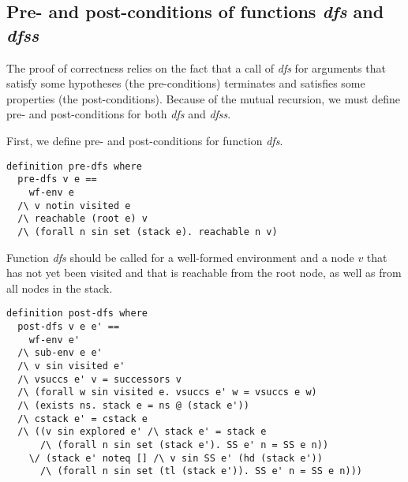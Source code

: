 \documentclass[sigplan,10pt,anonymous,review]{acmart}
\newcommand{\prog}[1]{\textit{#1}}
\begin{document}
\subsection{Pre- and post-conditions of functions \prog{dfs} and \prog{dfss}}
\label{sec:pre-post}

The proof of correctness relies on the fact that a call of \prog{dfs} for arguments that satisfy some hypotheses (the pre-conditions) terminates and satisfies some properties (the post-conditions). Because of the mutual recursion, we must define pre- and post-conditions for both \prog{dfs} and \prog{dfss}.

First, we define pre- and post-conditions for function \prog{dfs}.

\begin{small}
\begin{lstlisting}[language=isabelle]
definition pre-dfs where 
  pre-dfs v e ==
    wf-env e
  /\ v notin visited e
  /\ reachable (root e) v
  /\ (forall n sin set (stack e). reachable n v)
\end{lstlisting}
\end{small}

Function \prog{dfs} should be called for a well-formed environment and a node $v$ that has not yet been visited and that is reachable from the root node, as well as from all nodes in the stack.

\begin{small}
\begin{lstlisting}[language=isabelle]
definition post-dfs where 
  post-dfs v e e' ==
    wf-env e'
  /\ sub-env e e'
  /\ v sin visited e'
  /\ vsuccs e' v = successors v
  /\ (forall w sin visited e. vsuccs e' w = vsuccs e w)
  /\ (exists ns. stack e = ns @ (stack e'))
  /\ cstack e' = cstack e
  /\ ((v sin explored e' /\ stack e' = stack e 
      /\ (forall n sin set (stack e'). SS e' n = SS e n)) 
    \/ (stack e' noteq [] /\ v sin SS e' (hd (stack e')) 
      /\ (forall n sin set (tl (stack e')). SS e' n = SS e n)))
\end{lstlisting}
\end{small}
\end{document}
